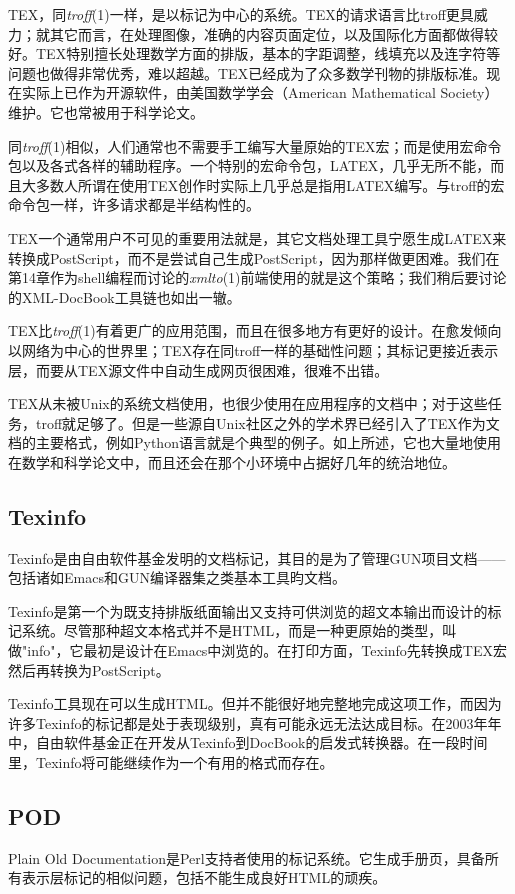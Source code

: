 \documentclass[12pt,oneside]{ctexbook}
\begin{document}
\begin{common-format}
TEX，同\textit{troff}(1)一样，是以标记为中心的系统。TEX的请求语言比troff更具威力；就其它而言，在处理图像，准确的内容页面定位，以及国际化方面都做得较好。TEX特别擅长处理数学方面的排版，基本的字距调整，线填充以及连字符等问题也做得非常优秀，难以超越。TEX已经成为了众多数学刊物的排版标准。现在实际上已作为开源软件，由美国数学学会（American Mathematical Society）维护。它也常被用于科学论文。

同\textit{troff}(1)相似，人们通常也不需要手工编写大量原始的TEX宏；而是使用宏命令包以及各式各样的辅助程序。一个特别的宏命令包，LATEX，几乎无所不能，而且大多数人所谓在使用TEX创作时实际上几乎总是指用LATEX编写。与troff的宏命令包一样，许多请求都是半结构性的。

TEX一个通常用户不可见的重要用法就是，其它文档处理工具宁愿生成LATEX来转换成PostScript，而不是尝试自己生成PostScript，因为那样做更困难。我们在第14章作为shell编程而讨论的\textit{xmlto}(1)前端使用的就是这个策略；我们稍后要讨论的XML-DocBook工具链也如出一辙。

TEX比\textit{troff}(1)有着更广的应用范围，而且在很多地方有更好的设计。在愈发倾向以网络为中心的世界里；TEX存在同troff一样的基础性问题；其标记更接近表示层，而要从TEX源文件中自动生成网页很困难，很难不出错。

TEX从未被Unix的系统文档使用，也很少使用在应用程序的文档中；对于这些任务，troff就足够了。但是一些源自Unix社区之外的学术界已经引入了TEX作为文档的主要格式，例如Python语言就是个典型的例子。如上所述，它也大量地使用在数学和科学论文中，而且还会在那个小环境中占据好几年的统治地位。

\subsection{Texinfo}
Texinfo是由自由软件基金发明的文档标记，其目的是为了管理GUN项目文档——包括诸如Emacs和GUN编译器集之类基本工具昀文档。

Texinfo是第一个为既支持排版纸面输出又支持可供浏览的超文本输出而设计的标记系统。尽管那种超文本格式并不是HTML，而是一种更原始的类型，叫做"info"，它最初是设计在Emacs中浏览的。在打印方面，Texinfo先转换成TEX宏然后再转换为PostScript。

Texinfo工具现在可以生成HTML。但并不能很好地完整地完成这项工作，而因为许多Texinfo的标记都是处于表现级别，真有可能永远无法达成目标。在2003年年中，自由软件基金正在开发从Texinfo到DocBook的启发式转换器。在一段时间里，Texinfo将可能继续作为一个有用的格式而存在。

\subsection{POD}
Plain Old Documentation是Perl支持者使用的标记系统。它生成手册页，具备所有表示层标记的相似问题，包括不能生成良好HTML的顽疾。


\end{common-format}
\end{document}

